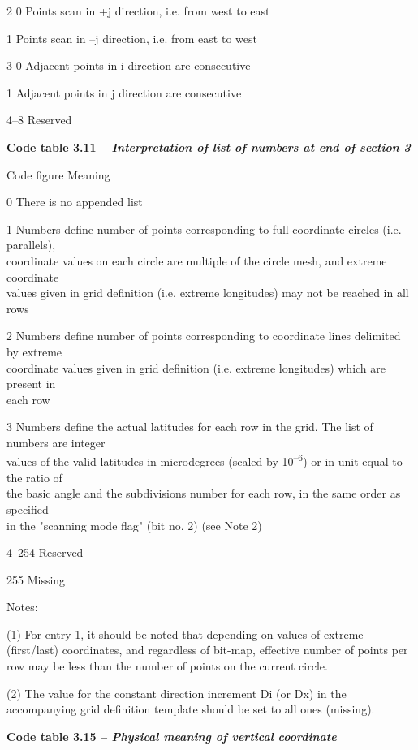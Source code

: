 2 0 Points scan in +j direction, i.e. from west to east

1 Points scan in --j direction, i.e. from east to west

3 0 Adjacent points in i direction are consecutive

1 Adjacent points in j direction are consecutive

4--8 Reserved

\textbf{Code table 3.11 -- \emph{Interpretation of list of numbers at end of section 3}}

Code figure Meaning

0 There is no appended list

1 Numbers define number of points corresponding to full coordinate circles (i.e. parallels),\\
coordinate values on each circle are multiple of the circle mesh, and extreme coordinate\\
values given in grid definition (i.e. extreme longitudes) may not be reached in all rows

2 Numbers define number of points corresponding to coordinate lines delimited by extreme\\
coordinate values given in grid definition (i.e. extreme longitudes) which are present in\\
each row

3 Numbers define the actual latitudes for each row in the grid. The list of numbers are integer\\
values of the valid latitudes in microdegrees (scaled by 10\textsuperscript{--6}) or in unit equal to the ratio of\\
the basic angle and the subdivisions number for each row, in the same order as specified\\
in the "scanning mode flag" (bit no. 2) (see Note 2)

4--254 Reserved

255 Missing

Notes:

(1) For entry 1, it should be noted that depending on values of extreme (first/last) coordinates, and regardless of bit-map, effective number of points per row may be less than the number of points on the current circle.

(2) The value for the constant direction increment Di (or Dx) in the accompanying grid definition template should be set to all ones (missing).

\textbf{Code table 3.15 -- \emph{Physical meaning of vertical coordinate}}

